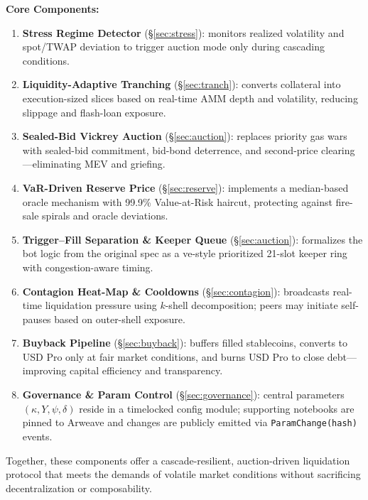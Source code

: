 \documentclass[11pt]{article}
\newcommand{\secref}[1]{\hyperref[#1]{\S\ref*{#1}}}
\begin{document}
\vspace{1em}
\noindent
\textbf{Core Components:}
\begin{enumerate}[label=\textbf{\arabic*.},wide, labelindent=0pt]
  \item \textbf{Stress Regime Detector} (\secref{sec:stress}): monitors realized volatility and spot/TWAP deviation to trigger auction mode only during cascading conditions.

  \item \textbf{Liquidity-Adaptive Tranching} (\secref{sec:tranch}): converts collateral into execution-sized slices based on real-time AMM depth and volatility, reducing slippage and flash-loan exposure.

  \item \textbf{Sealed-Bid Vickrey Auction} (\secref{sec:auction}): replaces priority gas wars with sealed-bid commitment, bid-bond deterrence, and second-price clearing—eliminating MEV and griefing.

  \item \textbf{VaR-Driven Reserve Price} (\secref{sec:reserve}): implements a median-based oracle mechanism with 99.9\% Value-at-Risk haircut, protecting against fire-sale spirals and oracle deviations.

  \item \textbf{Trigger–Fill Separation \& Keeper Queue} (\secref{sec:auction}): formalizes the bot logic from the original spec as a ve-style prioritized 21-slot keeper ring with congestion-aware timing.

  \item \textbf{Contagion Heat-Map \& Cooldowns} (\secref{sec:contagion}): broadcasts real-time liquidation pressure using $k$-shell decomposition; peers may initiate self-pauses based on outer-shell exposure.

  \item \textbf{Buyback Pipeline} (\secref{sec:buyback}): buffers filled stablecoins, converts to USD Pro only at fair market conditions, and burns USD Pro to close debt—improving capital efficiency and transparency.
  \item \textbf{Governance \& Param Control} (\secref{sec:governance}): central parameters \((\kappa, Y, \psi, \delta)\) reside in a timelocked config module; supporting notebooks are pinned to Arweave and changes are publicly emitted via \texttt{ParamChange(hash)} events.

\end{enumerate}

\noindent
Together, these components offer a cascade-resilient, auction-driven liquidation protocol that meets the demands of volatile market conditions without sacrificing decentralization or composability.
\end{document}

